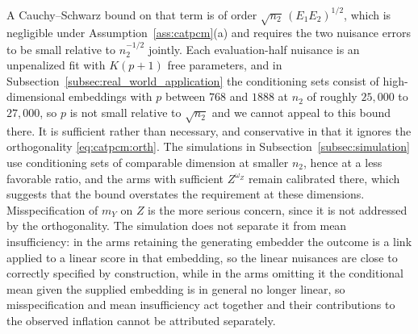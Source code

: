 \documentclass[twoside,11pt]{article}
\begin{document}
A Cauchy--Schwarz bound on that term is of order $\sqrt{n_2}\,(E_1E_2)^{1/2}$, which is negligible under Assumption~\ref{ass:catpcm}(a) and requires the two nuisance errors to be small relative to $n_2^{-1/2}$ jointly. Each evaluation-half nuisance is an unpenalized fit with $K(p+1)$ free parameters, and in Subsection~\ref{subsec:real_world_application} the conditioning sets consist of high-dimensional embeddings with $p$ between $768$ and $1888$ at $n_2$ of roughly $25{,}000$ to $27{,}000$, so $p$ is not small relative to $\sqrt{n_2}$ and we cannot appeal to this bound there. 
It is sufficient rather than necessary, and conservative in that it ignores the orthogonality \eqref{eq:catpcm:orth}. The simulations in Subsection~\ref{subsec:simulation} use conditioning sets of comparable dimension at smaller $n_2$, hence at a less favorable ratio, and the arms with sufficient $Z^{\omega_Z}$ remain calibrated there, which suggests that the bound overstates the requirement at these dimensions. 
Misspecification of $m_Y$ on $Z$ is the more serious concern, since it is not addressed by the orthogonality. The simulation does not separate it from mean insufficiency: in the arms retaining the generating embedder the outcome is a link applied to a linear score in that embedding, so the linear nuisances are close to correctly specified by construction, while in the arms omitting it the conditional mean given the supplied embedding is in general no longer linear, so misspecification and mean insufficiency act together and their contributions to the observed inflation cannot be attributed separately.

\vskip 0.2in

\end{document}

